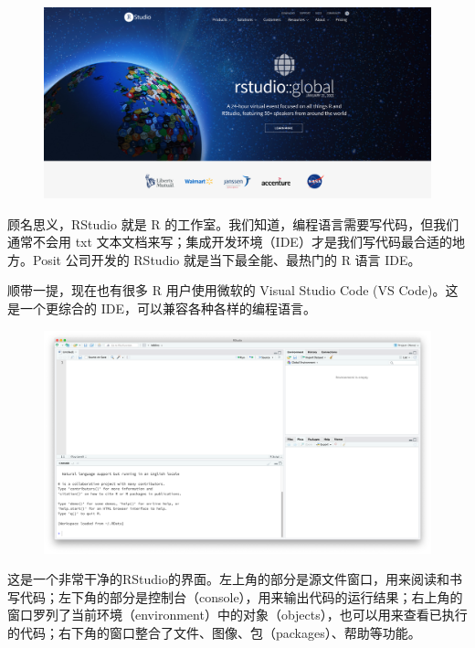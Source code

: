 \documentclass[
  letterpaper,
]{ctexbook}
\begin{document}
\begin{figure}

{\centering \includegraphics[width=5.20833in,height=\textheight]{fig/rstudioweb.png}

}

\end{figure}

顾名思义，RStudio 就是 R
的工作室。我们知道，编程语言需要写代码，但我们通常不会用 txt
文本文档来写；集成开发环境（IDE）才是我们写代码最合适的地方。Posit
公司开发的 RStudio 就是当下最全能、最热门的 R 语言 IDE。

顺带一提，现在也有很多 R 用户使用微软的 Visual Studio Code (VS
Code)。这是一个更综合的 IDE，可以兼容各种各样的编程语言。

\begin{figure}

{\centering \includegraphics[width=5.20833in,height=\textheight]{fig/rstudio.png}

}

\end{figure}

这是一个非常干净的RStudio的界面。左上角的部分是源文件窗口，用来阅读和书写代码；左下角的部分是控制台（console），用来输出代码的运行结果；右上角的窗口罗列了当前环境（environment）中的对象（objects），也可以用来查看已执行的代码；右下角的窗口整合了文件、图像、包（packages）、帮助等功能。
\end{document}
